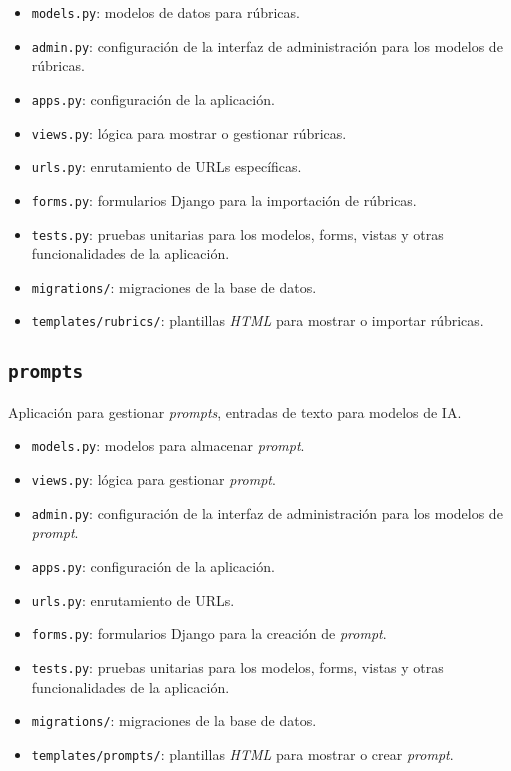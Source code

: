 \begin{itemize}
    \item \texttt{models.py}: modelos de datos para rúbricas.
    \item \texttt{admin.py}: configuración de la interfaz de administración para los modelos de rúbricas.
    \item \texttt{apps.py}: configuración de la aplicación.
    \item \texttt{views.py}: lógica para mostrar o gestionar rúbricas.
    \item \texttt{urls.py}: enrutamiento de URLs específicas.
    \item \texttt{forms.py}: formularios Django para la importación de rúbricas.
    \item \texttt{tests.py}: pruebas unitarias para los modelos, forms, vistas y otras funcionalidades de la aplicación.
    \item \texttt{migrations/}: migraciones de la base de datos.
    \item \texttt{templates/rubrics/}: plantillas \textit{HTML} para mostrar o importar rúbricas.
\end{itemize}

\subsection{\texttt{prompts}}
Aplicación para gestionar \textit{prompts}, entradas de texto para modelos de IA.

\begin{itemize}
    \item \texttt{models.py}: modelos para almacenar \textit{prompt}.
    \item \texttt{views.py}: lógica para gestionar \textit{prompt}.
    \item \texttt{admin.py}: configuración de la interfaz de administración para los modelos de \textit{prompt}.
    \item \texttt{apps.py}: configuración de la aplicación.
    \item \texttt{urls.py}: enrutamiento de URLs.
    \item \texttt{forms.py}: formularios Django para la creación de \textit{prompt}.
    \item \texttt{tests.py}: pruebas unitarias para los modelos, forms, vistas y otras funcionalidades de la aplicación.
    \item \texttt{migrations/}: migraciones de la base de datos.
    \item \texttt{templates/prompts/}: plantillas \textit{HTML} para mostrar o crear \textit{prompt}.
\end{itemize}

